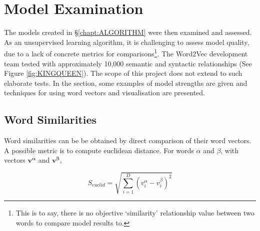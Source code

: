 \chapter{Model Examination}
\label{chapt:VALIDATION}
The models created in \S\ref{chapt:ALGORITHM} were then examined and assessed. As an unsupervised learning algorithm, it is challenging to assess model quality, due to a lack of concrete metrics for comparisons\footnote{This is to say, there is no objective `similarity' relationship value between two words to compare model results to.}. The Word2Vec development team tested with approximately 10,000 semantic and syntactic relationships (See Figure \ref{fig:KINGQUEEN})\cite{word2vec1}\cite{word2vec2}\cite{word2veckingqueen}. The scope of this project does not extend to such elaborate tests. In the section, some examples of model strengths are given and techniques for using word vectors and visualisation are presented. 
\section{Word Similarities}
Word similarities can be be obtained by direct comparison of their word vectors. A possible metric is to compute euclidean distance.  For words $\alpha$ and $\beta$, with vectors $\mathbf{v^\alpha}$ and $\mathbf{v^\beta}$, 

$$S_{euclid} = \sqrt{\sum_{i=1}^{D}(v_i^{\alpha}-v_i^{\beta})^{2}} $$

